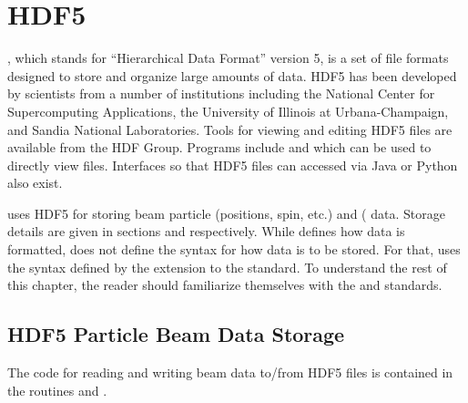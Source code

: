 \chapter{HDF5}
\label{c:hdf5}

, which stands for ``Hierarchical Data Format'' version 5\cite{b:hdf5}, is a set of file
formats designed to store and organize large amounts of data. HDF5 has been developed by scientists
from a number of institutions including the National Center for Supercomputing Applications, the
University of Illinois at Urbana-Champaign, and Sandia National Laboratories. Tools for viewing and
editing HDF5 files are available from the HDF Group\cite{b:hdf5}. Programs include  and
 which can be used to directly view files. Interfaces so that HDF5 files can accessed
via Java or Python also exist.

\bmad uses HDF5 for storing beam particle (positions, spin, etc.) and 
( data. Storage details are given in sections  and
 respectively. While  defines how data is formatted,  does not
define the syntax for how data is to be stored. For that, \bmad uses the syntax defined by the
 extension to the  standard\cite{b:openpmd}. To understand the rest of
this chapter, the reader should familiarize themselves with the  and 
standards.

\section{HDF5 Particle Beam Data Storage}
\label{s:hdf5.beam}

The code for reading and writing beam data to/from HDF5 files is contained in the routines
 and .

